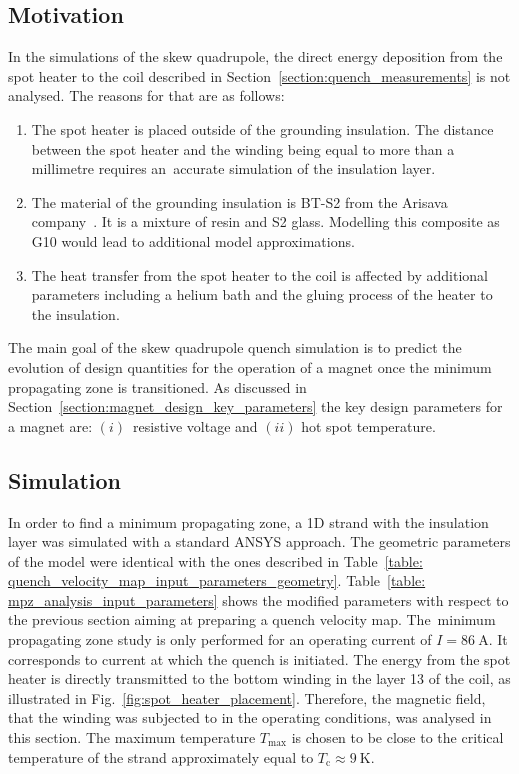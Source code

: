 
\subsection{Motivation}

In the simulations of the skew quadrupole, the direct energy deposition from the spot heater to the coil described in Section~\ref{section:quench_measurements} is not analysed. The reasons for that are as follows: 

\begin{enumerate}
    \item The spot heater is placed outside of the grounding insulation. The distance between the spot heater and the winding being equal to more than a millimetre requires an~accurate simulation of the insulation layer. 
    \item The material of the grounding insulation is BT-S2 from the Arisava company~\cite{arisawa_company}. It is a mixture of resin and S2 glass. Modelling this composite as G10 would lead to additional model approximations. 
    \item The heat transfer from the spot heater to the coil is affected by additional parameters including a helium bath and the gluing process of the heater to the insulation. 
\end{enumerate}

The main goal of the skew quadrupole quench simulation is to predict the evolution of design quantities for the operation of a magnet once the minimum propagating zone is transitioned. As discussed in Section~\ref{section:magnet_design_key_parameters} the key design parameters for a magnet are: $(i)$~resistive voltage and $(ii)$ hot spot temperature.

\subsection{Simulation}

In order to find a minimum propagating zone, a 1D strand with the insulation layer was simulated with a standard ANSYS approach. The geometric parameters of the model were identical with the ones described in Table~\ref{table: quench_velocity_map_input_parameters_geometry}. Table~\ref{table: mpz_analysis_input_parameters} shows the modified parameters with respect to the previous section aiming at preparing a quench velocity map. The~minimum propagating zone study is only performed for an operating current of $I=86~\text{A}$. It corresponds to current at which the quench is initiated. The energy from the spot heater is directly transmitted to the bottom winding in the layer 13 of the coil, as illustrated in Fig.~\ref{fig:spot_heater_placement}. Therefore, the magnetic field, that the winding was subjected to in the operating conditions, was analysed in this section. The maximum temperature $T_\text{max}$ is chosen to be close to the critical temperature of the strand approximately equal to $T_\text{c} \approx 9~\text{K}$.

